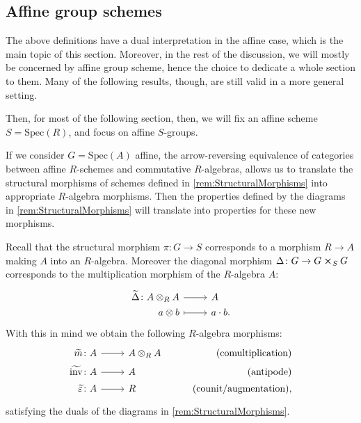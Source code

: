 \subsection{Affine group schemes}
The above definitions have a dual interpretation in the affine case,
which is the main topic of this section.
Moreover, in the rest of the discussion, we will mostly be concerned by
affine group scheme, hence the choice to dedicate a whole section to them.
Many of the following results, though, are still valid in a more general setting.

Then, for most of the following section, then, we will fix an affine scheme
$S = \mathrm{Spec}(R)$, and focus on affine $S$-groups.


\begin{rem}[]
If we consider $G = \mathrm{Spec}(A)$ affine, 
the arrow-reversing equivalence of categories between
affine $R$-schemes and commutative $R$-algebras, 
allows us to translate the structural morphisms
of schemes defined in \cref{rem:StructuralMorphisms} into
appropriate $R$-algebra morphisms.
Then the properties defined by the diagrams in \cref{rem:StructuralMorphisms}
will translate into properties for these new morphisms.

Recall that the structural morphism $\pi\colon G \to S$ corresponds to a
morphism $R \to A$ making $A$ into an $R$-algebra.
Moreover the diagonal morphism $\Delta\colon G \to G \cross_{ S } G$ corresponds
to the multiplication morphism of the $R$-algebra $A$:
\begin{equation*}
\begin{tikzcd}[row sep = 0ex
	,/tikz/column 1/.append style={anchor=base east}
	,/tikz/column 2/.append style={anchor=base west}]
	\widetilde{\Delta}\colon A \otimes_R A \arrow[r, "", rightarrow] &
	A \\
	a \otimes b \arrow[r, "", mapsto] & a \cdot b
.\end{tikzcd}
\end{equation*} 
With this in mind we obtain the following $R$-algebra morphisms:
\begin{equation*}
		\begin{tikzcd}[row sep = 0ex
 ,/tikz/column 1/.append style={anchor=base east}
 ,/tikz/column 2/.append style={anchor=base west}
 ,/tikz/column 3/.append style={anchor=base east}]
		\widetilde{m}\colon A \arrow[r, "", rightarrow] &
		A \otimes_R A & \text{(comultiplication)} \\
		\widetilde{\mathrm{inv}}\colon A \arrow[r, "", rightarrow] &
		A \phantom{\otimes_R}& \text{(antipode)} \\
		\widetilde{\varepsilon} \colon A \arrow[r, "", rightarrow] &
		R & \text{(counit/augmentation),}
	\end{tikzcd}
\end{equation*} 
satisfying the duals of the diagrams in \cref{rem:StructuralMorphisms}.
\end{rem}


